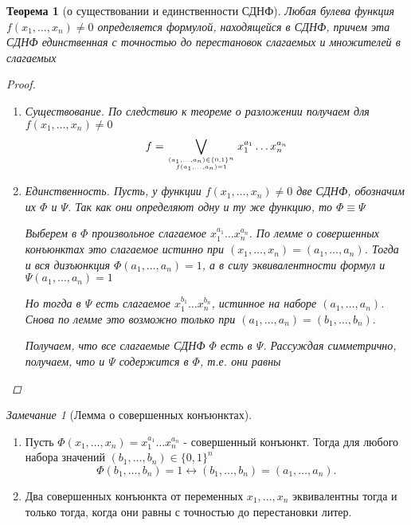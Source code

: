 \documentclass[a4paper]{article}
\newtheorem{theorem}{Теорема}[section]
\theoremstyle{definition}
\theoremstyle{remark}
\newtheorem*{remark}{Замечание}
\begin{document}
	\begin{theorem}[о существовании и единственности СДНФ]
		Любая булева функция $f(x_1, \dots , x_n) \neq 0$ определяется формулой, 
        находящейся в СДНФ, причем эта СДНФ единственная с точностью до перестановок слагаемых и множителей в слагаемых
		\begin{proof}
			\begin{enumerate}
				\item Существование. По следствию к теореме о разложении получаем для $f(x_1, \dots , x_n) \neq 0$
					$$f = \bigvee_{(a_1, \dots , a_n) \in \{0, 1\}^n\atop{f(a_1, \dots , a_n) = 1}} x_1^{a_1} \dots  x_n^{a_n}$$
				\item Единственность. Пусть, у функции $f(x_1, \dots , x_n) \neq 0$ две СДНФ, обозначим их $\Phi$ и $\Psi$. Так как они определяют одну и ту же функцию, то $\Phi \equiv \Psi$

					Выберем в $\Phi$ произвольное слагаемое $x_1^{a_1}\dots x_n^{a_n}$. По лемме о совершенных конъюнктах это слагаемое истинно при $(x_1, \dots , x_n) = (a_1, \dots , a_n)$. Тогда и вся дизъюнкция $\Phi(a_1, \dots , a_n) = 1$, а в силу эквивалентности формул и $\Psi(a_1, \dots , a_n) = 1$

					Но тогда в $\Psi$ есть слагаемое $x_1^{b_1}\dots x_n^{b_n}$, истинное на наборе $(a_1, \dots , a_n)$. Снова по лемме это возможно только при $(a_1, \dots , a_n)  = (b_1, \dots , b_n).$

					Получаем, что все слагаемые СДНФ $\Phi$ есть в $\Psi$. Рассуждая симметрично, получаем, что и $\Psi$ содержится в $\Phi$, т.е. они равны
			\end{enumerate}
		\end{proof}
	\end{theorem}
	\begin{remark}[Лемма о совершенных конъюнктах]
		\begin{enumerate}
            \item Пусть $\Phi(x_1, \dots , x_n) =  x_1^{a_1}\dots x_n^{a_n}$ - совершенный конъюнкт. 
            Тогда для любого набора значений $(b_1, \dots , b_n) \in \{0, 1\}^n$ $$ \Phi(b_1, \dots , b_n) = 1 \leftrightarrow (b_1, \dots , b_n) = (a_1, \dots , a_n).$$
            \item Два совершенных конъюнкта от переменных $x_1, \dots , x_n$ эквивалентны 
            тогда и только тогда, когда они равны с точностью до перестановки литер.
        \end{enumerate}
	\end{remark}
\end{document}
